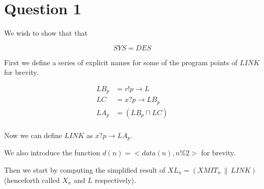 \documentclass[a4paper, 10pt]{article}
\newcommand{\conc}{\, \| \,}
\begin{document}
\maketitle
\newpage
\tableofcontents
\newpage

\section{Question 1}

We wish to show that that

\begin{equation*}
  SYS = DES
\end{equation*}

First we define a series of explicit names for some of the program
points of $LINK$ for brevity.

\begin{align*}
  LB_p &= r!p \to L \\
  LC &= x?p \to LB_p \\
  LA_p &= (LB_p \sqcap LC) \\
\end{align*}

Now we can define $LINK$ as $x?p \to LA_p$.

We also introduce the function $d(n) = <data(n), n \% 2>$ for brevity.

Then we start by computing the simplified result of $XL_n = (XMIT_n
\conc LINK)$ (henceforth called $X_n$ and $L$ respectively).
\end{document}

